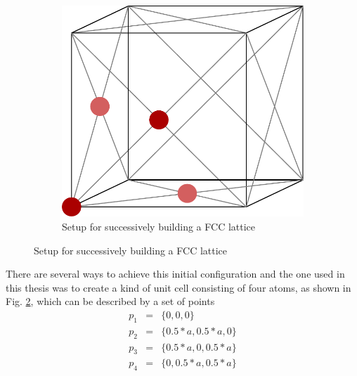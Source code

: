 \documentclass[12pt]{article}
\begin{document}
\begin{figure}[h]
\begin{center}
\begin{subfigure}[t]{0.4\textwidth}
            \includegraphics[scale=0.3]{images/unit_cell.pdf}
            \caption{Setup for successively building a FCC lattice}
            \label{fig:unitcell}
        \end{subfigure}
    \end{center}
\end{figure}
There are several ways to achieve this initial configuration and the one used in this thesis \cite{buffalo} was to create a kind of unit cell 
consisting of four atoms, as shown in Fig. \ref{fig:unitcell}, which can be described by a set of points
\begin{eqnarray*}
    p_1 &=& \{0,0,0\}\\
    p_2 &=& \{0.5*a,0.5*a,0\}\\
    p_3 &=& \{0.5*a,0,0.5*a\}\\
    p_4 &=& \{0,0.5*a,0.5*a\}
\end{eqnarray*}
\end{document}
